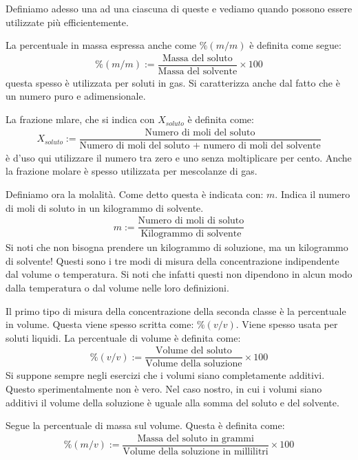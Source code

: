 \documentclass[../AppuntiChimica]{subfiles}
\begin{document}
	Definiamo adesso una ad una ciascuna di queste e vediamo quando possono essere utilizzate più efficientemente.
	
	La percentuale in massa espressa anche come $ \%(m/m) $ è definita come segue:
	\begin{gather}
		\%(m/m):=\dfrac{\text{Massa del soluto}}{\text{Massa del solvente}}\times 100
	\end{gather}
	questa spesso è utilizzata per soluti in gas. Si caratterizza anche dal fatto che è un numero puro e adimensionale.
	
	La frazione mlare, che si indica con $ X_{soluto} $ è definita come:
	\begin{gather}
		X_{soluto}:=\dfrac{\text{Numero di moli del soluto}}{\text{Numero di moli del soluto + numero di moli del solvente}}
	\end{gather}
	è d'uso qui utilizzare il numero tra zero e uno senza moltiplicare per cento. Anche la frazione molare è spesso utilizzata per mescolanze di gas.
	
	Definiamo ora la molalità. Come detto questa è indicata con: $ m $. Indica il numero di moli di soluto in un kilogrammo di solvente.
	\begin{gather}
		m:=\dfrac{\text{Numero di moli di soluto}}{\text{Kilogrammo di solvente}}
	\end{gather}
	Si noti che non bisogna prendere un kilogrammo di soluzione, ma un kilogrammo di solvente! Questi sono i tre modi di misura della concentrazione indipendente dal volume o temperatura. Si noti che infatti questi non dipendono in alcun modo dalla temperatura o dal volume nelle loro definizioni.
	
	Il primo tipo di misura della concentrazione della seconda classe è la percentuale in volume. Questa viene spesso scritta come: $ \%(v/v) $. Viene spesso usata per soluti liquidi. La percentuale di volume è definita come:
	\begin{gather}
		\%(v/v):=\dfrac{\text{Volume del soluto}}{\text{Volume della soluzione}}\times 100
	\end{gather}
	Si suppone sempre negli esercizi che i volumi siano completamente additivi. Questo sperimentalmente non è vero. Nel caso nostro, in cui i volumi siano additivi il volume della soluzione è uguale alla somma del soluto e del solvente.
	
	Segue la percentuale di massa sul volume. Questa è definita come:
	\begin{gather}
	\%(m/v):=\dfrac{\text{Massa del soluto in grammi}}{\text{Volume della soluzione in millilitri}}\times 100
	\end{gather}
	
\end{document}
